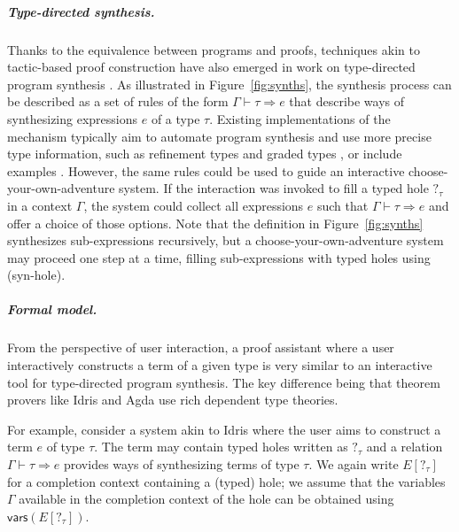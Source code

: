 \documentclass[anonymous, a4paper,UKenglish,cleveref, autoref, thm-restate]{lipics-v2021}
\newcommand{\ident}[1]{\textsf{#1}}
\begin{document}
\subparagraph{Type-directed synthesis.}
Thanks to the equivalence between programs and proofs, techniques akin to tactic-based proof
construction have also emerged in work on type-directed program synthesis \cite{knoth-2023-synthesis}.
As illustrated in Figure~\ref{fig:synths}, the synthesis process can be described as a set of
rules of the form $\Gamma \vdash \tau \Rightarrow e$ that describe ways of synthesizing
expressions $e$ of a type $\tau$. Existing implementations of the mechanism typically aim to
automate program synthesis and use more precise type information, such as refinement types
\cite{polikarpova-2016-synthesis} and graded types \cite{hughes-2024-synthesis}, or include
examples \cite{osera-2015-synthesis}. However, the same rules could be used to guide an
interactive choose-your-own-adventure system. If the interaction was invoked to fill a typed
hole $?_\tau$ in a context $\Gamma$, the system could collect all expressions $e$ such that
$\Gamma \vdash \tau \Rightarrow e$ and offer a choice of those options. Note that the definition
in Figure~\ref{fig:synths} synthesizes sub-expressions recursively, but a choose-your-own-adventure
system may proceed one step at a time, filling sub-expressions with typed holes using (\ident{syn-hole}).

\subparagraph{Formal model.}
From the perspective of user interaction, a proof assistant where a user interactively constructs
a term of a given type is very similar to an interactive tool for type-directed program synthesis.
The key difference being that theorem provers like Idris and Agda use rich dependent type theories.

For example, consider a system akin to Idris where the user aims to construct a term $e$ of type
$\tau$. The term may contain typed holes written as $?_\tau$ and a relation $\Gamma\vdash \tau\Rightarrow e$
provides ways of synthesizing terms of type $\tau$. We again write $E[?_\tau]$ for a
completion context containing a (typed) hole; we assume that the variables $\Gamma$ available in
the completion context of the hole can be obtained using $\ident{vars}(E[?_\tau])$.
\end{document}
